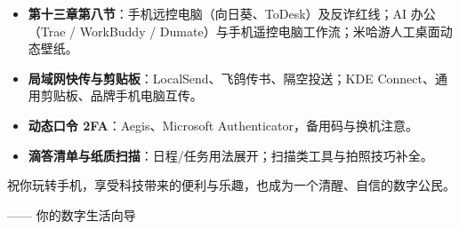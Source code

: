 
\begin{itemize}
  \item \textbf{第十三章第八节}：手机远控电脑（向日葵、ToDesk）及反诈红线；AI 办公（Trae / WorkBuddy / Dumate）与手机遥控电脑工作流；米哈游人工桌面动态壁纸。
  \item \textbf{局域网快传与剪贴板}：LocalSend、飞鸽传书、隔空投送；KDE Connect、通用剪贴板、品牌手机电脑互传。
  \item \textbf{动态口令 2FA}：Aegis、Microsoft Authenticator，备用码与换机注意。
  \item \textbf{滴答清单与纸质扫描}：日程/任务用法展开；扫描类工具与拍照技巧补全。
\end{itemize}

祝你玩转手机，享受科技带来的便利与乐趣，也成为一个清醒、自信的数字公民。

—— 你的数字生活向导
